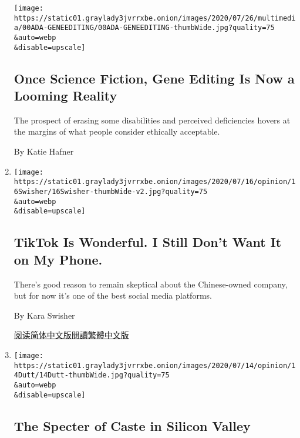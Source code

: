 \begin{enumerate}
  \texttt{[image: https://static01.graylady3jvrrxbe.onion/images/2020/07/26/multimedia/00ADA-GENEEDITING/00ADA-GENEEDITING-thumbWide.jpg?quality=75\\\&auto=webp\\\&disable=upscale]}

  \hypertarget{once-science-fiction-gene-editing-is-now-a-looming-reality}{%
  \subsection{Once Science Fiction, Gene Editing Is Now a Looming
  Reality}\label{once-science-fiction-gene-editing-is-now-a-looming-reality}}

  The prospect of erasing some disabilities and perceived deficiencies
  hovers at the margins of what people consider ethically acceptable.

  By Katie Hafner
\item
  \href{/2020/07/17/opinion/tiktok-ban-china.html}{}

  \texttt{[image: https://static01.graylady3jvrrxbe.onion/images/2020/07/16/opinion/16Swisher/16Swisher-thumbWide-v2.jpg?quality=75\\\&auto=webp\\\&disable=upscale]}

  \hypertarget{tiktok-is-wonderful-i-still-dont-want-it-on-my-phone}{%
  \subsection{TikTok Is Wonderful. I Still Don't Want It on My
  Phone.}\label{tiktok-is-wonderful-i-still-dont-want-it-on-my-phone}}

  There's good reason to remain skeptical about the Chinese-owned
  company, but for now it's one of the best social media platforms.

  By Kara Swisher

  \href{https://cn.nytimes3xbfgragh.onion/opinion/20200720/tiktok-ban-china/}{阅读简体中文版}\href{https://cn.nytimes3xbfgragh.onion/opinion/20200720/tiktok-ban-china/zh-hant/}{閱讀繁體中文版}
\item
  \href{/2020/07/14/opinion/caste-cisco-indian-americans-discrimination.html}{}

  \texttt{[image: https://static01.graylady3jvrrxbe.onion/images/2020/07/14/opinion/14Dutt/14Dutt-thumbWide.jpg?quality=75\\\&auto=webp\\\&disable=upscale]}

  \hypertarget{the-specter-of-caste-in-silicon-valley}{%
  \subsection{The Specter of Caste in Silicon
  Valley}\label{the-specter-of-caste-in-silicon-valley}}


\end{enumerate}
